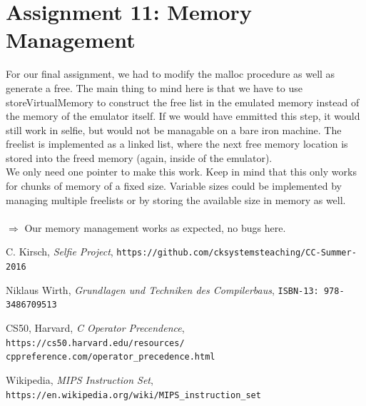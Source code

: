\documentclass[a4paper,12pt]{article}
\begin{document}
\section{Assignment 11: Memory Management}
For our final assignment, we had to modify the malloc procedure as well as generate a free. The main thing to mind here is that we have to use storeVirtualMemory to construct the free list in the emulated memory instead of the memory of the emulator itself. If we would have emmitted this step, it would still work in selfie, but would not be managable on a bare iron machine. The freelist is implemented as a linked list, where the next free memory location is stored into the freed memory (again, inside of the emulator).\\We only need one pointer to make this work. Keep in mind that this only works for chunks of memory of a fixed size. Variable sizes could be implemented by managing multiple freelists or by storing the available size in memory as well. 
\\\\
$\Rightarrow$ Our memory management works as expected, no bugs here. 
\begin{thebibliography}{99}

C. Kirsch, \textit{Selfie Project},
\texttt{https://github.com/cksystemsteaching/CC-Summer-2016}

Niklaus Wirth, \textit{Grundlagen und Techniken des Compilerbaus},
\texttt{ISBN-13: 978-3486709513}

CS50, Harvard, \textit{C Operator Precendence},
\texttt{https://cs50.harvard.edu/resources/\\cppreference.com/operator\_precedence.html}

Wikipedia, \textit{MIPS Instruction Set},
\texttt{https://en.wikipedia.org/wiki/MIPS\_instruction\_set}

\end{thebibliography}
\end{document}
